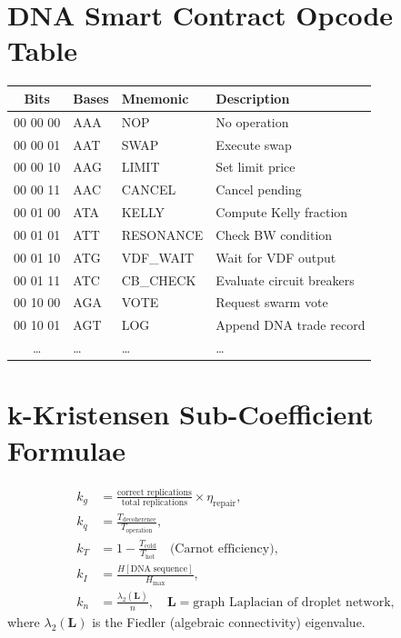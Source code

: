\documentclass[12pt,a4paper]{article}
\begin{document}
\section{DNA Smart Contract Opcode Table}
\label{app:dna-opcodes}

\begin{center}
\begin{tabular}{clll}
\toprule
\textbf{Bits} & \textbf{Bases} & \textbf{Mnemonic} & \textbf{Description} \\
\midrule
00 00 00 & AAA & NOP     & No operation \\
00 00 01 & AAT & SWAP    & Execute swap \\
00 00 10 & AAG & LIMIT   & Set limit price \\
00 00 11 & AAC & CANCEL  & Cancel pending \\
00 01 00 & ATA & KELLY   & Compute Kelly fraction \\
00 01 01 & ATT & RESONANCE & Check BW condition \\
00 01 10 & ATG & VDF\_WAIT & Wait for VDF output \\
00 01 11 & ATC & CB\_CHECK & Evaluate circuit breakers \\
00 10 00 & AGA & VOTE    & Request swarm vote \\
00 10 01 & AGT & LOG     & Append DNA trade record \\
\ldots   & \ldots & \ldots & \ldots \\
\bottomrule
\end{tabular}
\end{center}

\section{k-Kristensen Sub-Coefficient Formulae}
\label{app:k-subs}

\begin{align}
k_g &= \frac{\text{correct replications}}{\text{total replications}} \times \eta_\mathrm{repair}, \\[4pt]
k_q &= \frac{T_{\mathrm{decoherence}}}{T_{\mathrm{operation}}}, \\[4pt]
k_T &= 1 - \frac{T_\mathrm{cold}}{T_\mathrm{hot}} \quad \text{(Carnot efficiency)}, \\[4pt]
k_I &= \frac{H[\mathrm{DNA\;sequence}]}{H_\mathrm{max}}, \\[4pt]
k_n &= \frac{\lambda_2(\mathbf{L})}{n}, \quad \mathbf{L} = \text{graph Laplacian of droplet network},
\end{align}
where $\lambda_2(\mathbf{L})$ is the Fiedler (algebraic connectivity) eigenvalue.
\end{document}
